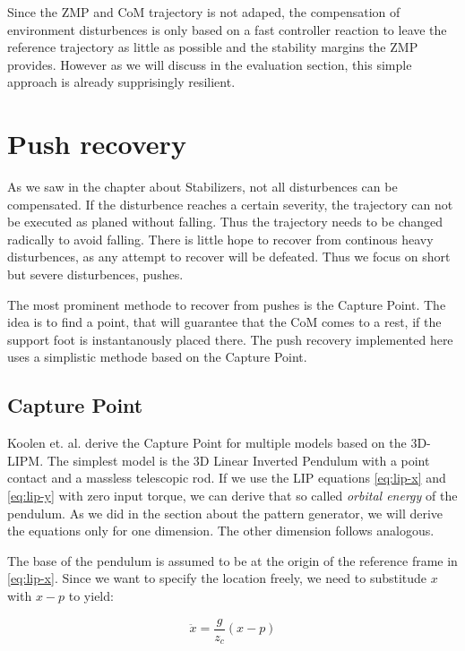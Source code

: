 \documentclass[english,ngerman]{KITreprt}
\begin{document}
Since the ZMP and CoM trajectory is not adaped, the compensation of
environment disturbences is only based on a fast controller reaction to
leave the reference trajectory as little as possible and the stability
margins the ZMP provides. However as we will discuss in the evaluation
section, this simple approach is already supprisingly resilient.

\chapter{Push recovery}\label{push-recovery}

As we saw in the chapter about Stabilizers, not all disturbences can be
compensated. If the disturbence reaches a certain severity, the
trajectory can not be executed as planed without falling. Thus the
trajectory needs to be changed radically to avoid falling. There is
little hope to recover from continous heavy disturbences, as any attempt
to recover will be defeated. Thus we focus on short but severe
disturbences, pushes.

The most prominent methode to recover from pushes is the Capture Point.
The idea is to find a point, that will guarantee that the CoM comes to a
rest, if the support foot is instantanously placed there. The push
recovery implemented here uses a simplistic methode based on the Capture
Point.

\section{Capture Point}\label{capture-point}

Koolen et. al. \cite{koolen2012capturability} derive the Capture Point
for multiple models based on the 3D-LIPM. The simplest model is the 3D
Linear Inverted Pendulum with a point contact and a massless telescopic
rod. If we use the LIP equations \ref{eq:lip-x} and \ref{eq:lip-y} with
zero input torque, we can derive that so called \emph{orbital energy} of
the pendulum. As we did in the section about the pattern generator, we
will derive the equations only for one dimension. The other dimension
follows analogous.

The base of the pendulum is assumed to be at the origin of the reference
frame in \ref{eq:lip-x}. Since we want to specify the location freely,
we need to substitude $x$ with $x - p$ to yield:

\begin{equation} \label{eq:lip-x-general}
\ddot{x} = \frac{g}{z_c} (x - p)
\end{equation}
\end{document}
